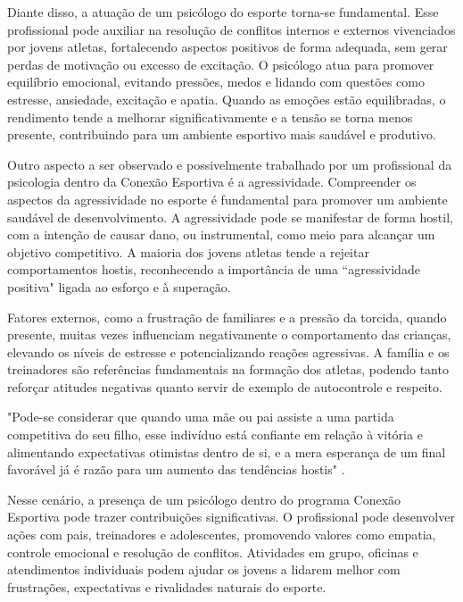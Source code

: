 \begin{Desenvolvimento}
Diante disso, a atuação de um psicólogo do esporte torna-se fundamental. Esse profissional pode auxiliar na resolução de conflitos internos e externos vivenciados por jovens atletas, fortalecendo aspectos positivos de forma adequada, sem gerar perdas de motivação ou excesso de excitação. O psicólogo atua para promover equilíbrio emocional, evitando pressões, medos e lidando com questões como estresse, ansiedade, excitação e apatia. Quando as emoções estão equilibradas, o rendimento tende a melhorar significativamente e a tensão se torna menos presente, contribuindo para um ambiente esportivo mais saudável e produtivo.

Outro aspecto a ser observado e possivelmente trabalhado por um profissional da psicologia dentro da Conexão Esportiva é a agressividade. Compreender os aspectos da agressividade no esporte é fundamental para promover um ambiente saudável de desenvolvimento. A agressividade pode se manifestar de forma hostil, com a intenção de causar dano, ou instrumental, como meio para alcançar um objetivo competitivo. A maioria dos jovens atletas tende a rejeitar comportamentos hostis, reconhecendo a importância de uma “agressividade positiva" ligada ao esforço e à superação. 

Fatores externos, como a frustração de familiares e a pressão da torcida, quando presente, muitas vezes influenciam negativamente o comportamento das crianças, elevando os níveis de estresse e potencializando reações agressivas. A família e os treinadores são referências fundamentais na formação dos atletas, podendo tanto reforçar atitudes negativas quanto servir de exemplo de autocontrole e respeito. 

\begin{citacaodiretalonga}
"Pode-se considerar que quando uma mãe ou pai assiste a uma partida competitiva do seu filho, esse indivíduo está confiante em relação à vitória e alimentando expectativas otimistas dentro de si, e a mera esperança de um final favorável já é razão para um aumento das tendências hostis" .
\end{citacaodiretalonga}

Nesse cenário, a presença de um psicólogo dentro do programa Conexão Esportiva pode trazer contribuições significativas. O profissional pode desenvolver ações com pais, treinadores e adolescentes, promovendo valores como empatia, controle emocional e resolução de conflitos. Atividades em grupo, oficinas e atendimentos individuais podem ajudar os jovens a lidarem melhor com frustrações, expectativas e rivalidades naturais do esporte.


\end{Desenvolvimento}
